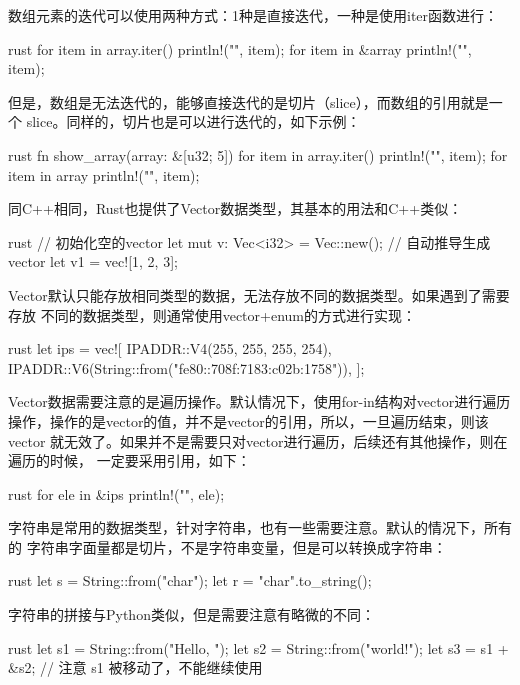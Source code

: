 数组元素的迭代可以使用两种方式：1种是直接迭代，一种是使用iter函数进行：
\begin{code-block}{rust}
for item in array.iter() {
    println!("{}", item);
}
for item in &array {
    println!("{}", item);
}
\end{code-block}
但是，数组是无法迭代的，能够直接迭代的是切片（slice），而数组的引用就是一个
slice。同样的，切片也是可以进行迭代的，如下示例：
\begin{code-block}{rust}
fn show_array(array: &[u32; 5]) {
    for item in array.iter() {
        println!("{}", item);
    }
    for item in array {
        println!("{}", item);
    }
}
\end{code-block}

同C++相同，Rust也提供了Vector数据类型，其基本的用法和C++类似：
\begin{code-block}{rust}
// 初始化空的vector
let mut v: Vec<i32> = Vec::new();
// 自动推导生成vector
let v1 = vec![1, 2, 3];
\end{code-block}

Vector默认只能存放相同类型的数据，无法存放不同的数据类型。如果遇到了需要存放
不同的数据类型，则通常使用vector+enum的方式进行实现：
\begin{code-block}{rust}
let ips = vec![
    IPADDR::V4(255, 255, 255, 254),
    IPADDR::V6(String::from("fe80::708f:7183:c02b:1758")),
];
\end{code-block}

Vector数据需要注意的是遍历操作。默认情况下，使用for-in结构对vector进行遍历
操作，操作的是vector的值，并不是vector的引用，所以，一旦遍历结束，则该vector
就无效了。如果并不是需要只对vector进行遍历，后续还有其他操作，则在遍历的时候，
一定要采用引用，如下：
\begin{code-block}{rust}
for ele in &ips {
    println!("{}", ele);
}
\end{code-block}

字符串是常用的数据类型，针对字符串，也有一些需要注意。默认的情况下，所有的
字符串字面量都是切片，不是字符串变量，但是可以转换成字符串：
\begin{code-block}{rust}
let s = String::from("char");
let r = "char".to_string();
\end{code-block}

字符串的拼接与Python类似，但是需要注意有略微的不同：
\begin{code-block}{rust}
let s1 = String::from("Hello, ");
let s2 = String::from("world!");
let s3 = s1 + &s2; // 注意 s1 被移动了，不能继续使用
\end{code-block}

